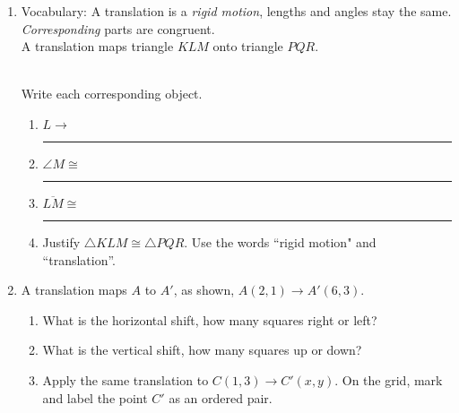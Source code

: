 \begin{enumerate}
\newpage
\item Vocabulary: A translation is a \emph{rigid motion}, lengths and angles stay the same. \emph{Corresponding} parts are congruent. \\[0.5cm]
A translation maps triangle $KLM$ onto triangle $PQR$. \vspace{0.5cm}
  \begin{multicols}{2}
    \\
    Write each corresponding object.
    \begin{enumerate}
      \item $L \rightarrow$ \rule{2cm}{0.15mm}
      \item $\angle M \cong$ \rule{2cm}{0.15mm}
      \item $\overline {LM} \cong$ \rule{2cm}{0.15mm}
      \item Justify $\triangle KLM \cong \triangle PQR$. Use the words ``rigid motion" and ``translation''.
    \end{enumerate}
  \end{multicols}

\item A translation maps $A$ to $A'$, as shown, $A(2,1) \rightarrow A'(6,3)$.
\begin{multicols}{2}
  \begin{enumerate}
    \item What is the horizontal shift, how many squares right or left? \vspace{1.25cm}
    \item What is the vertical shift, how many squares up or down? \vspace{1.25cm}
    \item Apply the same translation to $C(1,3)\rightarrow C'(x,y)$. On the grid, mark and label the point $C'$ as an ordered pair.
    \end{enumerate}
    \begin{flushright}
    \end{flushright}
\end{multicols}



\end{enumerate}
